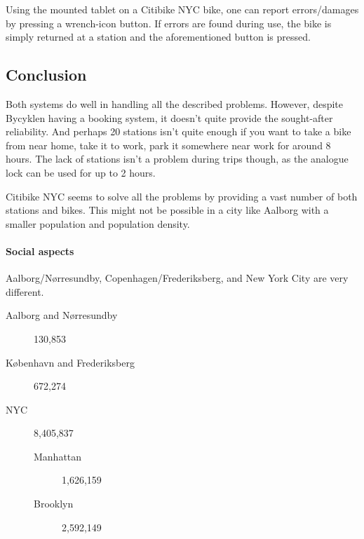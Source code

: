 Using the mounted tablet on a Citibike NYC bike, one can report errors/damages by pressing a wrench-icon button.
If errors are found during use, the bike is simply returned at a station and the aforementioned button is pressed.

\subsection{Conclusion}
Both systems do well in handling all the described problems.
However, despite Bycyklen having a booking system, it doesn't quite provide the sought-after reliability.
And perhaps 20 stations isn't quite enough if you want to take a bike from near home, take it to work, park it somewhere near work for around 8 hours.
The lack of stations isn't a problem during trips though, as the analogue lock can be used for up to 2 hours.

Citibike NYC seems to solve all the problems by providing a vast number of both stations and bikes.
This might not be possible in a city like Aalborg with a smaller population and population density.

\paragraph{Social aspects}
Aalborg/Nørresundby, Copenhagen/Frederiksberg, and New York City are very different.
\begin{description}
\item[Aalborg and Nørresundby\cite{bef44}] 130,853
\item[København and Frederiksberg\cite{bef44}] 672,274
\item[NYC\cite{nyc}] 8,405,837
\begin{description}
\item[Manhattan\cite{nyc}] 1,626,159
\item[Brooklyn\cite{nyc}] 2,592,149
\end{description}
\end{description}

